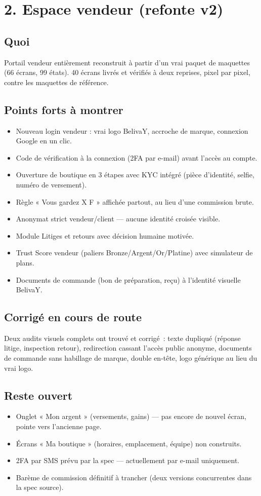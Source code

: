\documentclass[11pt]{article}
\newcommand{\fait}[1]{\item[\textcolor{okgreen}{\textbf{\checkmark}}] #1}
\newcommand{\reste}[1]{\item[\textcolor{warnred}{\textbf{!}}] #1}
\begin{document}
\newpage
\section*{2. Espace vendeur (refonte v2)}

\subsection*{Quoi}
Portail vendeur entièrement reconstruit à partir d'un vrai paquet de maquettes (66 écrans, 99 états). 40 écrans livrés et vérifiés à deux reprises, pixel par pixel, contre les maquettes de référence.

\subsection*{Points forts à montrer}
\begin{itemize}
\fait{Nouveau login vendeur : vrai logo BelivaY, accroche de marque, connexion Google en un clic.}
\fait{Code de vérification à la connexion (2FA par e-mail) avant l'accès au compte.}
\fait{Ouverture de boutique en 3 étapes avec KYC intégré (pièce d'identité, selfie, numéro de versement).}
\fait{Règle « Vous gardez X F » affichée partout, au lieu d'une commission brute.}
\fait{Anonymat strict vendeur/client — aucune identité croisée visible.}
\fait{Module Litiges et retours avec décision humaine motivée.}
\fait{Trust Score vendeur (paliers Bronze/Argent/Or/Platine) avec simulateur de plans.}
\fait{Documents de commande (bon de préparation, reçu) à l'identité visuelle BelivaY.}
\end{itemize}

\subsection*{Corrigé en cours de route}
Deux audits visuels complets ont trouvé et corrigé~: texte dupliqué (réponse litige, inspection retour), redirection cassant l'accès public anonyme, documents de commande sans habillage de marque, double en-tête, logo générique au lieu du vrai logo.

\subsection*{Reste ouvert}
\begin{itemize}
\reste{Onglet « Mon argent » (versements, gains) — pas encore de nouvel écran, pointe vers l'ancienne page.}
\reste{Écrans « Ma boutique » (horaires, emplacement, équipe) non construits.}
\reste{2FA par SMS prévu par la spec — actuellement par e-mail uniquement.}
\reste{Barème de commission définitif à trancher (deux versions concurrentes dans la spec source).}
\end{itemize}
\end{document}

